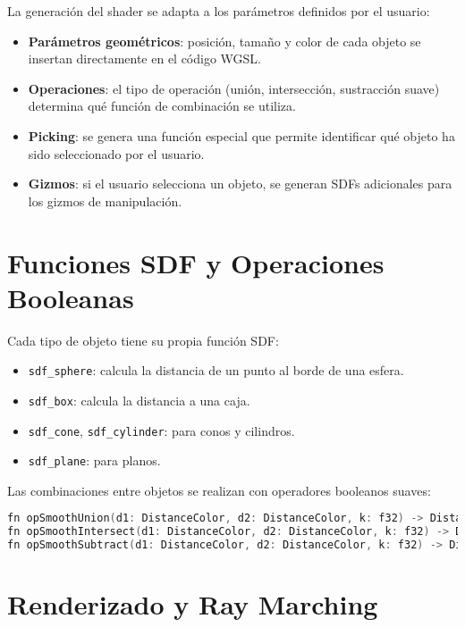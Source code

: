 La generación del shader se adapta a los parámetros definidos por el usuario:

\begin{itemize}
    \item \textbf{Parámetros geométricos}: posición, tamaño y color de cada objeto se insertan directamente en el código WGSL.
    \item \textbf{Operaciones}: el tipo de operación (unión, intersección, sustracción suave) determina qué función de combinación se utiliza.
    \item \textbf{Picking}: se genera una función especial que permite identificar qué objeto ha sido seleccionado por el usuario.
    \item \textbf{Gizmos}: si el usuario selecciona un objeto, se generan SDFs adicionales para los gizmos de manipulación.
\end{itemize}

\section{Funciones SDF y Operaciones Booleanas}

Cada tipo de objeto tiene su propia función SDF:

\begin{itemize}
    \item \texttt{sdf\_sphere}: calcula la distancia de un punto al borde de una esfera.
    \item \texttt{sdf\_box}: calcula la distancia a una caja.
    \item \texttt{sdf\_cone}, \texttt{sdf\_cylinder}: para conos y cilindros.
    \item \texttt{sdf\_plane}: para planos.
\end{itemize}

Las combinaciones entre objetos se realizan con operadores booleanos suaves:

\begin{lstlisting}[language=C++, caption={Operadores booleanos suaves}]
fn opSmoothUnion(d1: DistanceColor, d2: DistanceColor, k: f32) -> DistanceColor { ... }
fn opSmoothIntersect(d1: DistanceColor, d2: DistanceColor, k: f32) -> DistanceColor { ... }
fn opSmoothSubtract(d1: DistanceColor, d2: DistanceColor, k: f32) -> DistanceColor { ... }
\end{lstlisting}

\section{Renderizado y Ray Marching}

